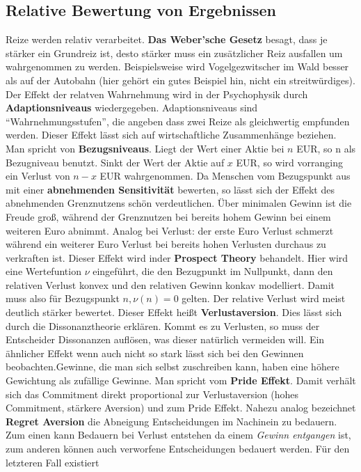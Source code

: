 \subsection{Relative Bewertung von Ergebnissen}
Reize werden relativ verarbeitet. \textbf{Das Weber'sche Gesetz} besagt, dass
je stärker ein Grundreiz ist, desto stärker muss ein zusätzlicher Reiz ausfallen
um wahrgenommen zu werden. Beispielsweise wird Vogelgezwitscher im Wald besser
als auf der Autobahn (hier gehört ein gutes Beispiel hin, nicht ein streitwürdiges).
Der Effekt der relatven Wahrnehmung wird in der Psychophysik durch
\textbf{Adaptionsniveaus} wiedergegeben. Adaptionsniveaus sind
``Wahrnehmungsstufen'', die angeben dass zwei Reize als gleichwertig empfunden werden.
Dieser Effekt lässt sich auf wirtschaftliche Zusammenhänge beziehen. Man
spricht von \textbf{Bezugsniveaus}. Liegt der Wert einer Aktie bei $n$ EUR, so
n als Bezugniveau benutzt. Sinkt der Wert der Aktie auf $x$ EUR, so wird
vorranging ein Verlust von $n-x$ EUR wahrgenommen. Da Menschen vom
Bezugspunkt aus mit einer \textbf{abnehmenden Sensitivität} bewerten, so
lässt sich der Effekt des abnehmenden Grenznutzens schön verdeutlichen.
Über minimalen Gewinn ist die Freude groß, während der Grenznutzen
bei bereits hohem Gewinn bei einem weiteren Euro abnimmt. Analog bei Verlust:
der erste Euro Verlust schmerzt während ein weiterer Euro Verlust bei bereits
hohen Verlusten durchaus zu verkraften ist.
Dieser Effekt wird inder \textbf{Prospect Theory} behandelt. Hier wird eine
Wertefuntion $\nu$ eingeführt, die den Bezugpunkt im Nullpunkt, dann
den relativen Verlust konvex und den relativen Gewinn konkav modelliert.
Damit muss also für Bezugspunkt $n, \nu(n) = 0$ gelten.
Der relative Verlust wird meist deutlich stärker bewertet. Dieser Effekt
heißt \textbf{Verlustaversion}. Dies lässt sich durch die Dissonanztheorie
erklären. Kommt es zu Verlusten, so muss der Entscheider Dissonanzen
auflösen, was dieser natürlich vermeiden will. Ein ähnlicher Effekt wenn
auch nicht so stark lässt sich bei den Gewinnen beobachten.Gewinne, die
man sich selbst zuschreiben kann, haben eine höhere Gewichtung als
zufällige Gewinne. Man spricht vom \textbf{Pride Effekt}. Damit verhält sich
das Commitment direkt proportional zur Verlustaversion
(hohes Commitment, stärkere Aversion) und zum Pride Effekt.
Nahezu analog bezeichnet \textbf{Regret Aversion} die Abneigung Entscheidungen
im Nachinein zu bedauern. Zum einen kann Bedauern bei Verlust entstehen da
einem \textit{Gewinn entgangen} ist, zum anderen können auch verworfene
Entscheidungen bedauert werden. Für den letzteren Fall existiert
